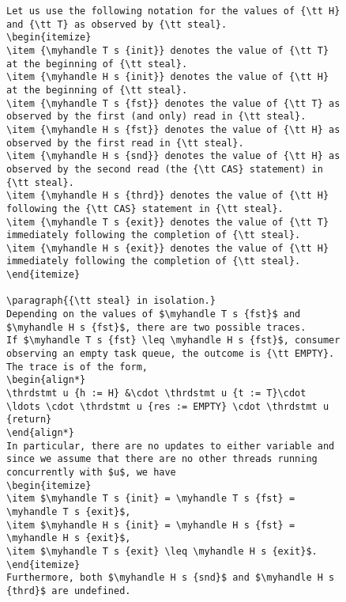 \documentclass[a4paper]{article}
\begin{document}
{\begin{figure}
\begin{lstlisting}
Let us use the following notation for the values of {\tt H} and {\tt T} as observed by {\tt steal}.
\begin{itemize}
\item {\myhandle T s {init}} denotes the value of {\tt T} at the beginning of {\tt steal}.
\item {\myhandle H s {init}} denotes the value of {\tt H} at the beginning of {\tt steal}.
\item {\myhandle T s {fst}} denotes the value of {\tt T} as observed by the first (and only) read in {\tt steal}.
\item {\myhandle H s {fst}} denotes the value of {\tt H} as observed by the first read in {\tt steal}.
\item {\myhandle H s {snd}} denotes the value of {\tt H} as observed by the second read (the {\tt CAS} statement) in {\tt steal}.
\item {\myhandle H s {thrd}} denotes the value of {\tt H} following the {\tt CAS} statement in {\tt steal}.
\item {\myhandle T s {exit}} denotes the value of {\tt T} immediately following the completion of {\tt steal}.
\item {\myhandle H s {exit}} denotes the value of {\tt H} immediately following the completion of {\tt steal}.
\end{itemize}

\paragraph{{\tt steal} in isolation.}
Depending on the values of $\myhandle T s {fst}$ and $\myhandle H s {fst}$, there are two possible traces.
If $\myhandle T s {fst} \leq \myhandle H s {fst}$, consumer observing an empty task queue, the outcome is {\tt EMPTY}.
The trace is of the form,
\begin{align*}
\thrdstmt u {h := H} &\cdot \thrdstmt u {t := T}\cdot \ldots \cdot \thrdstmt u {res := EMPTY} \cdot \thrdstmt u {return}
\end{align*}
In particular, there are no updates to either variable and since we assume that there are no other threads running concurrently with $u$, we have
\begin{itemize}
\item $\myhandle T s {init} = \myhandle T s {fst} = \myhandle T s {exit}$,
\item $\myhandle H s {init} = \myhandle H s {fst} = \myhandle H s {exit}$,
\item $\myhandle T s {exit} \leq \myhandle H s {exit}$.
\end{itemize}
Furthermore, both $\myhandle H s {snd}$ and $\myhandle H s {thrd}$ are undefined.


\end{lstlisting}
\end{figure}}
\end{document}

